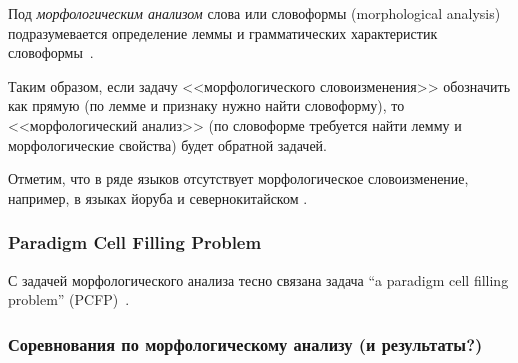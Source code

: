 Под \emph{морфологическим анализом} слова или словоформы (morphological analysis) 
подразумевается определение леммы и  
грамматических характеристик словоформы~\cite{MitreninaNikolaevLando2016}.

Таким образом, если задачу <<морфологического словоизменения>> обозначить как прямую  
(по лемме и признаку нужно найти словоформу), 
то <<морфологический анализ>> (по словоформе требуется найти 
лемму и морфологические свойства) будет обратной задачей. 


Отметим, что в ряде языков отсутствует морфологическое словоизменение, 
например, в языках йоруба и севернокитайском .




\subsubsection{Paradigm Cell Filling Problem}

С задачей морфологического анализа тесно связана задача 
``a paradigm cell filling problem'' (PCFP)~\cite{Ackerman08PartsAndWholes}.



\subsubsection{Соревнования по морфологическому анализу (и результаты?)}


